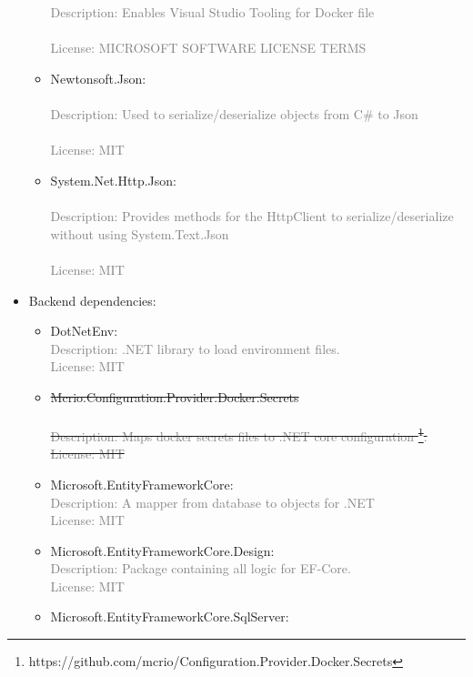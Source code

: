 \documentclass[10pt]{article}
\begin{document}
\begin{itemize}
\begin{itemize}
{        \\\\\textcolor{gray}{Description: Enables Visual Studio Tooling for Docker file}
        \\\\\textcolor{gray}{License: MICROSOFT SOFTWARE LICENSE TERMS}}
        \item Newtonsoft.Json:
        \\\\\textcolor{gray}{Description: Used to serialize/deserialize objects from C# to Json}
        \\\\\textcolor{gray}{License: MIT}
        \item System.Net.Http.Json:
        \\\\\textcolor{gray}{Description: Provides methods for the HttpClient to serialize/deserialize without using System.Text.Json}
        \\\\\textcolor{gray}{License: MIT}
    \end{itemize}
    \item Backend dependencies:
    \begin{itemize}
        \item DotNetEnv:
        \\\textcolor{gray}{Description: .NET library to load environment files.}
        \\\textcolor{gray}{License: MIT}
        \item \sout{Mcrio.Configuration.Provider.Docker.Secrets \\
        \\\textcolor{gray}{Description: Maps docker secrets files to .NET core configuration \footnote{https://github.com/mcrio/Configuration.Provider.Docker.Secrets}.} 
        \\\textcolor{gray}{License: MIT}}
        \item Microsoft.EntityFrameworkCore:
        \\\textcolor{gray}{Description: A mapper from database to objects for .NET}
        \\\textcolor{gray}{License: MIT}
        \item Microsoft.EntityFrameworkCore.Design:
        \\\textcolor{gray}{Description: Package containing all logic for EF-Core. }
        \\\textcolor{gray}{License: MIT}
        \item Microsoft.EntityFrameworkCore.SqlServer:

\end{itemize}
\end{itemize}
\end{document}
